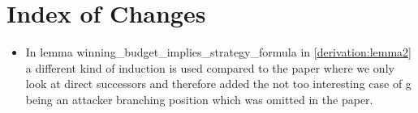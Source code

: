 \section{Index of Changes}

\begin{itemize}
    \item  In lemma winning_budget_implies_strategy_formula in \ref{derivation:lemma2} a different kind of induction is used compared to the paper 
where we only look at direct successors and therefore added the not too interesting case of g being an 
attacker branching position which was omitted in the paper.
\end{itemize}
